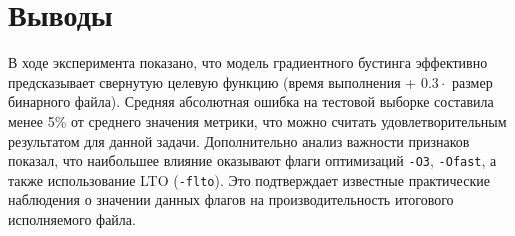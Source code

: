 \documentclass[12pt, oneside]{book}
\begin{document}
\section{Выводы}

В ходе эксперимента показано, что модель градиентного бустинга
эффективно предсказывает свернутую целевую функцию
(время выполнения + $0.3 \cdot$ размер бинарного файла).
Средняя абсолютная ошибка на тестовой выборке составила менее 5\%
от среднего значения метрики, что можно считать удовлетворительным результатом
для данной задачи.
Дополнительно анализ важности признаков показал, что наибольшее влияние
оказывают флаги оптимизаций \texttt{-O3}, \texttt{-Ofast}, а также использование
LTO (\texttt{-flto}). Это подтверждает известные практические наблюдения
о значении данных флагов на производительность итогового исполняемого файла.
\end{document}
